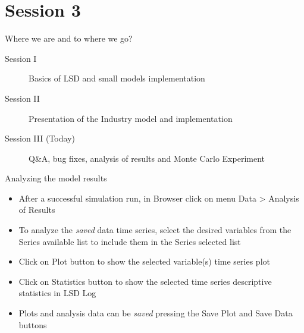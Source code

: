 \documentclass[bigger,aspectratio=169]{beamer}
\begin{document}
\section{Session 3}
\label{sec:orgfba8988}

\begin{frame}[label={sec:orgc795f99}]{Where we are and to where we go?}
\begin{description}
\item[{Session I}] Basics of LSD and small models implementation
\item[{Session II}] Presentation of the Industry model and implementation
\item[{Session III (Today)}] Q\&A, bug fixes, analysis of results and Monte Carlo Experiment
\end{description}
\end{frame}
\begin{frame}[label={sec:org88611f2}]{Analyzing the model results}
\begin{itemize}
\item After a successful simulation run, in \alert{Browser} click on menu \alert{Data > Analysis of Results}
\item To analyze the \emph{saved} data time series, select the desired variables from the \alert{Series available} list to include them in the \alert{Series selected} list
\item Click on \alert{Plot} button to show the selected variable(s) time series plot
\item Click on \alert{Statistics} button to show the selected time series descriptive statistics in \alert{LSD Log}
\item Plots and analysis data can be \emph{saved} pressing the \alert{Save Plot} and \alert{Save Data} buttons
\end{itemize}
\end{frame}
\end{document}
